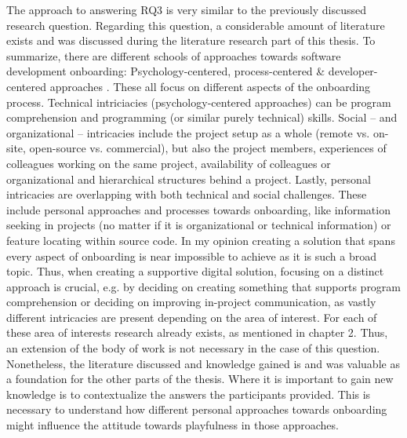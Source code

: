 The approach to answering RQ3 is very similar to the previously discussed research question. Regarding this question, a considerable amount of literature exists and was discussed during the literature research part of this thesis. To summarize, there are different schools of approaches towards software development onboarding: Psychology-centered, process-centered \& developer-centered approaches \cite{yates2014onboarding}. These all focus on different aspects of the onboarding process. Technical intriciacies (psychology-centered approaches) can be program comprehension and programming (or similar purely technical) skills. Social -- and organizational -- intricacies include the project setup as a whole (remote vs. on-site, open-source vs. commercial), but also the project members, experiences of colleagues working on the same project, availability of colleagues or organizational and hierarchical structures behind a project. Lastly, personal intricacies are overlapping with both technical and social challenges. These include personal approaches and processes towards onboarding, like information seeking in projects (no matter if it is organizational or technical information) or feature locating within source code. In my opinion creating a solution that spans every aspect of onboarding is near impossible to achieve as it is such a broad topic. Thus, when creating a supportive digital solution, focusing on a distinct approach is crucial, e.g. by deciding on creating something that supports program comprehension or deciding on improving in-project communication, as vastly different intricacies are present depending on the area of interest. For each of these area of interests research already exists, as mentioned in chapter 2. Thus, an extension of the body of work is not necessary in the case of this question. Nonetheless, the literature discussed and knowledge gained is and was valuable as a foundation for the other parts of the thesis. Where it is important to gain new knowledge is to contextualize the answers the participants provided. This is necessary to understand how different personal approaches towards onboarding might influence the attitude towards playfulness in those approaches.

